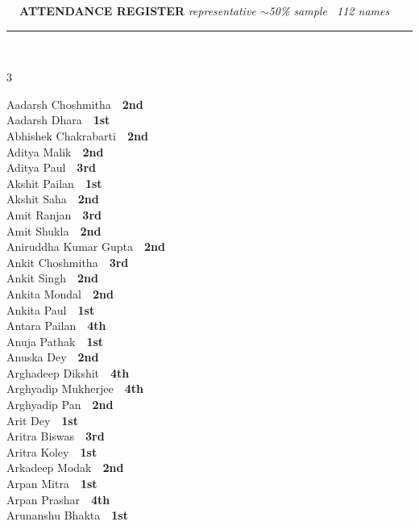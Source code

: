 \documentclass[11pt,a4paper]{article}
\begin{document}
\vspace{3pt}\noindent
{\footnotesize\bfseries\color{Slate}\faListOl~~ATTENDANCE REGISTER}%
\hfill{\scriptsize\itshape\color{Slate}representative $\sim$50\% sample \textperiodcentered\ 112 names}\\[3pt]
{\color{Line}\rule{\linewidth}{0.5pt}}\\[5pt]
\begingroup\footnotesize\setlength{\columnsep}{20pt}\setlength{\parskip}{1pt}%
\begin{multicols}{3}\raggedright
Aadarsh Choshmitha~\dotfill~\textbf{2nd}\\
Aadarsh Dhara~\dotfill~\textbf{1st}\\
Abhishek Chakrabarti~\dotfill~\textbf{2nd}\\
Aditya Malik~\dotfill~\textbf{2nd}\\
Aditya Paul~\dotfill~\textbf{3rd}\\
Akshit Pailan~\dotfill~\textbf{1st}\\
Akshit Saha~\dotfill~\textbf{2nd}\\
Amit Ranjan~\dotfill~\textbf{3rd}\\
Amit Shukla~\dotfill~\textbf{2nd}\\
Aniruddha Kumar Gupta~\dotfill~\textbf{2nd}\\
Ankit Choshmitha~\dotfill~\textbf{3rd}\\
Ankit Singh~\dotfill~\textbf{2nd}\\
Ankita Mondal~\dotfill~\textbf{2nd}\\
Ankita Paul~\dotfill~\textbf{1st}\\
Antara Pailan~\dotfill~\textbf{4th}\\
Anuja Pathak~\dotfill~\textbf{1st}\\
Anuska Dey~\dotfill~\textbf{2nd}\\
Arghadeep Dikshit~\dotfill~\textbf{4th}\\
Arghyadip Mukherjee~\dotfill~\textbf{4th}\\
Arghyadip Pan~\dotfill~\textbf{2nd}\\
Arit Dey~\dotfill~\textbf{1st}\\
Aritra Biswas~\dotfill~\textbf{3rd}\\
Aritra Koley~\dotfill~\textbf{1st}\\
Arkadeep Modak~\dotfill~\textbf{2nd}\\
Arpan Mitra~\dotfill~\textbf{1st}\\
Arpan Prashar~\dotfill~\textbf{4th}\\
Arunanshu Bhakta~\dotfill~\textbf{1st}\\

\end{multicols}
\end{document}
